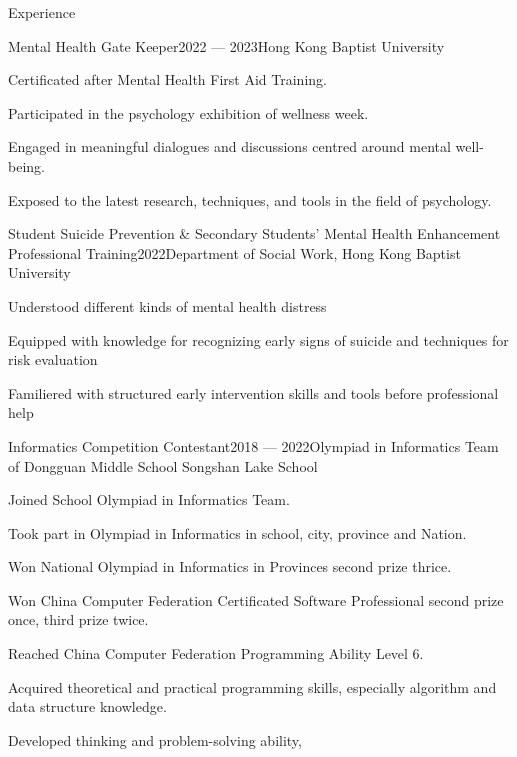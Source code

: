 \documentclass[
	11pt, %
]{resume} %
\begin{document}
\begin{rSection}{Experience}
    \begin{rSubsection}{Mental Health Gate Keeper}{2022 --- 2023}{Hong Kong Baptist University}{}
        \item Certificated after Mental Health First Aid Training.
        \item Participated in the psychology exhibition of wellness week.
        \item Engaged in meaningful dialogues and discussions centred around mental well-being.
        \item Exposed to the latest research, techniques, and tools in the field of psychology.
    \end{rSubsection}

    \begin{rSubsection}{Student Suicide Prevention \& Secondary Students' Mental Health Enhancement Professional Training}{2022}{Department of Social Work, Hong Kong Baptist University}{}
        \item Understood different kinds of mental health distress
        \item Equipped with knowledge  for recognizing early signs of suicide and techniques for risk evaluation
        \item Familiered with structured early intervention skills and tools before professional help
    \end{rSubsection}

    \begin{rSubsection}{Informatics Competition Contestant}{2018 --- 2022}{Olympiad in Informatics Team of Dongguan Middle School Songshan Lake School}{}
        \item Joined School Olympiad in Informatics Team.
        \item Took part in Olympiad in Informatics in school, city, province and Nation.
        \item Won National Olympiad in Informatics in Provinces second prize thrice.
        \item Won China Computer Federation Certificated Software Professional second prize once, third prize twice.
        \item Reached China Computer Federation Programming Ability Level 6.
        \item Acquired theoretical and practical programming skills, especially algorithm and data structure knowledge.
        \item Developed thinking and problem-solving ability,
    \end{rSubsection}

\end{rSection}
\end{document}

